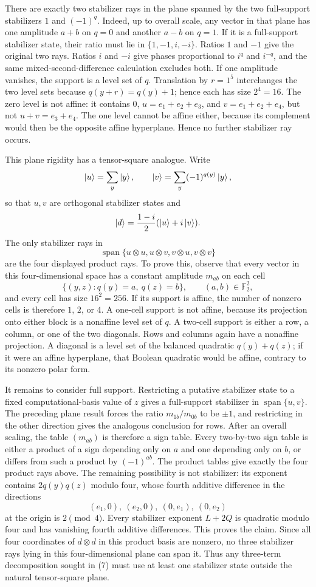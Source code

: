 \documentclass[11pt]{article}
\theoremstyle{definition}
\newcommand{\F}{\mathbb{F}}
\begin{document}
There are exactly two stabilizer rays in the plane spanned by the two full-support stabilizers $1$ and $(-1)^q$. Indeed, up to overall scale, any vector in that plane has one amplitude $a+b$ on $q=0$ and another $a-b$ on $q=1$. If it is a full-support stabilizer state, their ratio must lie in $\{1,-1,i,-i\}$. Ratios $1$ and $-1$ give the original two rays. Ratios $i$ and $-i$ give phases proportional to $i^q$ and $i^{-q}$, and the same mixed-second-difference calculation excludes both. If one amplitude vanishes, the support is a level set of $q$. Translation by $r=1^5$ interchanges the two level sets because $q(y+r)=q(y)+1$; hence each has size $2^4=16$. The zero level is not affine: it contains $0$, $u=e_1+e_2+e_3$, and $v=e_1+e_2+e_4$, but not $u+v=e_3+e_4$. The one level cannot be affine either, because its complement would then be the opposite affine hyperplane. Hence no further stabilizer ray occurs.

This plane rigidity has a tensor-square analogue. Write
\[
\ket{u}=\sum_y\ket{y},\qquad
\ket{v}=\sum_y(-1)^{q(y)}\ket{y},
\]
so that $u,v$ are orthogonal stabilizer states and
\[
\ket{d}=\frac{1-i}{2}(\ket{u}+i\ket{v}).
\]
The only stabilizer rays in
\[
\operatorname{span}\{u\otimes u,u\otimes v,v\otimes u,v\otimes v\}
\]
are the four displayed product rays. To prove this, observe that every vector in this four-dimensional space has a constant amplitude $m_{ab}$ on each cell
\[
\{(y,z):q(y)=a,\ q(z)=b\},\qquad (a,b)\in\F_2^2,
\]
and every cell has size $16^2=256$. If its support is affine, the number of nonzero cells is therefore $1$, $2$, or $4$. A one-cell support is not affine, because its projection onto either block is a nonaffine level set of $q$. A two-cell support is either a row, a column, or one of the two diagonals. Rows and columns again have a nonaffine projection. A diagonal is a level set of the balanced quadratic $q(y)+q(z)$; if it were an affine hyperplane, that Boolean quadratic would be affine, contrary to its nonzero polar form.

It remains to consider full support. Restricting a putative stabilizer state to a fixed computational-basis value of $z$ gives a full-support stabilizer in $\operatorname{span}\{u,v\}$. The preceding plane result forces the ratio $m_{1b}/m_{0b}$ to be $\pm1$, and restricting in the other direction gives the analogous conclusion for rows. After an overall scaling, the table $(m_{ab})$ is therefore a sign table. Every two-by-two sign table is either a product of a sign depending only on $a$ and one depending only on $b$, or differs from such a product by $(-1)^{ab}$. The product tables give exactly the four product rays above. The remaining possibility is not stabilizer: its exponent contains $2q(y)q(z)$ modulo four, whose fourth additive difference in the directions
\[
(e_1,0),\ (e_2,0),\ (0,e_1),\ (0,e_2)
\]
at the origin is $2\pmod4$. Every stabilizer exponent $L+2Q$ is quadratic modulo four and has vanishing fourth additive differences. This proves the claim. Since all four coordinates of $d\otimes d$ in this product basis are nonzero, no three stabilizer rays lying in this four-dimensional plane can span it. Thus any three-term decomposition sought in (7) must use at least one stabilizer state outside the natural tensor-square plane.
\end{document}
